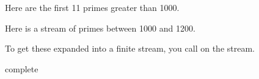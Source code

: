 {\begin{xtc}
\begin{TeXOutput}
\begin{fricasmath}{3}
%
\end{fricasmath}
\end{TeXOutput}
\end{xtc}
\begin{xtc}
\begin{xtccomment}
Here are the first 11 primes greater than 1000.
\end{xtccomment}
\begin{spadsrc}
\end{spadsrc}
\begin{TeXOutput}
\begin{fricasmath}{4}
%
\end{fricasmath}
\end{TeXOutput}
\end{xtc}
\begin{xtc}
\begin{xtccomment}
Here is a stream of primes between 1000 and 1200.
\end{xtccomment}
\begin{spadsrc}
\end{spadsrc}
\begin{TeXOutput}
\begin{fricasmath}{5}
%
\end{fricasmath}
\end{TeXOutput}
\end{xtc}
\begin{xtc}
\begin{xtccomment}
To get these expanded into a finite stream,
you call  on the stream.
\end{xtccomment}
\begin{spadsrc}
complete %
\end{spadsrc}
\begin{TeXOutput}
\begin{fricasmath}{6}
%

\end{fricasmath}
\end{TeXOutput}
\end{xtc}}

